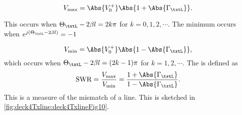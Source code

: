 \begin{equation}\label{eqn:uwaves4TransmissionLines:1160}
V_{\mathrm{max}} = \Abs{V_0^{+}} \Abs{ 1 + \Abs{\Gamma_\txtL} }.
\end{equation}

This occurs when \( \Theta_\txtL - 2 \beta l = 2 k \pi \) for \( k = 0, 1, 2, \cdots \).  The minimum occurs when \( e^{j (\Theta_\txtL -2 \beta l)}  = -1 \)

\begin{equation}\label{eqn:uwaves4TransmissionLines:1180}
V_{\mathrm{min}} = \Abs{V_0^{+}} \Abs{ 1 - \Abs{\Gamma_\txtL} },
\end{equation}
which occurs when \( \Theta_\txtL - 2 \beta l = (2 k - 1 )\pi \) for \( k = 1, 2, \cdots \).  The  is defined as
\begin{equation}\label{eqn:uwaves4TransmissionLines:1200}
\textrm{SWR} = \frac{V_{\mathrm{max}}}{V_{\mathrm{min}}} = \frac{ 1 + \Abs{\Gamma_\txtL} }{ 1 - \Abs{\Gamma_\txtL} }.
\end{equation}
This is a measure of the mismatch of a line.  This is sketched in \cref{fig:deck4Txline:deck4TxlineFig10}.

